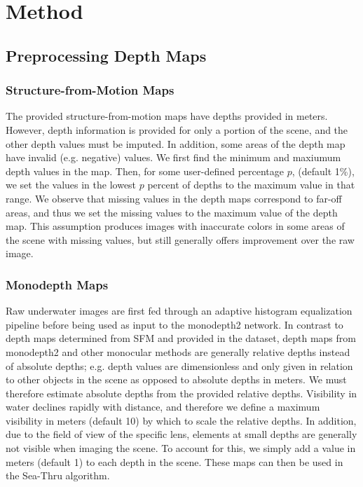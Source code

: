 \documentclass[10pt,twocolumn,letterpaper]{article}
\begin{document}
\section{Method}

\subsection{Preprocessing Depth Maps}

\subsubsection*{Structure-from-Motion Maps}
The provided structure-from-motion maps have depths provided in meters.
However, depth information is provided for only a portion of the scene, and the other depth
values must be imputed.
In addition, some areas of the depth map have invalid (e.g. negative)
values.
We first find the minimum and maxiumum depth values in the map. Then, for some user-defined
percentage $p$, (default 1\%), we set the values in the lowest $p$ percent of depths to the maximum
value in that range.
We observe that missing values in the depth maps correspond to far-off areas, and thus we set the
missing values to the maximum value of the depth map.
This assumption produces images with inaccurate colors in some areas of the scene with missing values,
but still generally offers improvement over the raw image.

\subsubsection*{Monodepth Maps}
Raw underwater images are first fed through an adaptive histogram equalization pipeline before being used
as input to the monodepth2 network.
In contrast to depth maps determined from SFM and provided in the dataset, depth maps from monodepth2 and other monocular
methods are generally relative depths instead of absolute depths;
e.g. depth values are dimensionless and only given in relation to other objects in the scene as
opposed to absolute depths in meters.
We must therefore estimate absolute depths from the provided relative depths. Visibility in water declines
rapidly with distance, and therefore we define a maximum visibility in meters (default 10) by which to scale the
relative depths. In addition, due to the field of view of the specific lens, elements at small depths
are generally not visible when imaging the scene. To account for this, we simply add a value in meters (default 1)
to each depth in the scene. These maps can then be used in the Sea-Thru algorithm.
\end{document}
